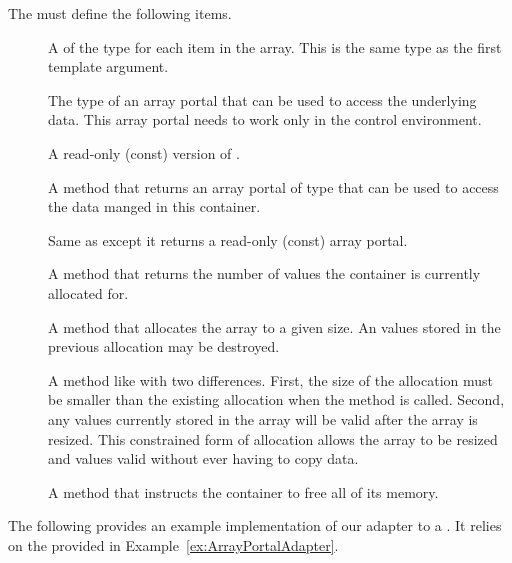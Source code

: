 The  must define the following items.
\begin{description}
\item[] A  of the type for each item
  in the array. This is the same type as the first template argument.
\item[] The type of an array portal that can be used
  to access the underlying data. This array portal needs to work only in
  the control environment.
\item[] A read-only (const) version of
  .
\item[] A method that returns an array portal of type
   that can be used to access the data manged in this
  container.
\item[] Same as  except it
  returns a read-only (const) array portal.
\item[] A method that returns the number of
  values the container is currently allocated for.
\item[] A method that allocates the array to a given
  size. An values stored in the previous allocation may be destroyed.
\item[] A method like  with two
  differences. First, the size of the allocation must be smaller than the
  existing allocation when the method is called. Second, any values
  currently stored in the array will be valid after the array is
  resized. This constrained form of allocation allows the array to be
  resized and values valid without ever having to copy data.
\item[] A method that instructs the container to
  free all of its memory.
\end{description}

The following provides an example implementation of our adapter to a
. It relies on the
 provided in
Example~\ref{ex:ArrayPortalAdapter}.

